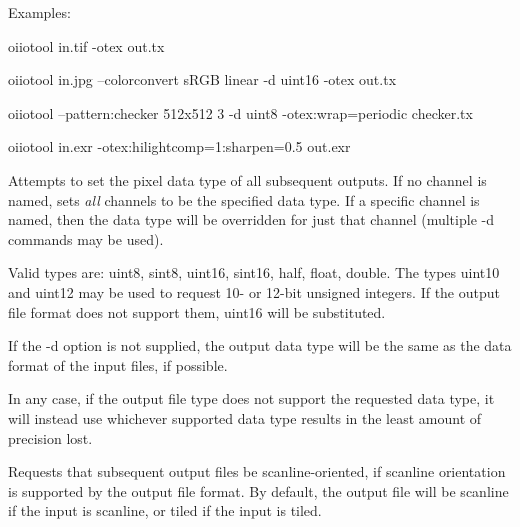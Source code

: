 \noindent Examples:
\begin{smallcode}
    oiiotool in.tif -otex out.tx

    oiiotool in.jpg --colorconvert sRGB linear -d uint16 -otex out.tx

    oiiotool --pattern:checker 512x512 3 -d uint8 -otex:wrap=periodic checker.tx

    oiiotool in.exr -otex:hilightcomp=1:sharpen=0.5 out.exr
\end{smallcode}

\apiend


Attempts to set the pixel data type of all subsequent outputs.  If no
channel is named, sets \emph{all} channels to be the specified data
type.  If a specific channel is named, then the data type will be
overridden for just that channel (multiple {\cf -d} commands may be
used).

Valid types are: {\cf uint8}, {\cf sint8}, 
{\cf uint16}, {\cf sint16}, {\cf  half}, {\cf float}, {\cf double}.
The types {\cf uint10} and {\cf uint12} may be used to request 10- or
12-bit unsigned integers.  If the output file format does not support
them, {\cf uint16} will be substituted.

If the {\cf -d} option is not supplied, the output data type will
be the same as the data format of the input files, if possible.

In any case, if the output file type does not support the requested
data type, it will instead use whichever supported data type results
in the least amount of precision lost.
\apiend



\label{sec:oiiotool:scanline}
Requests that subsequent output files be scanline-oriented, if scanline
orientation is supported by the output file format.  By default, the
output file will be scanline if the input is scanline, or tiled if the
input is tiled.
\apiend

